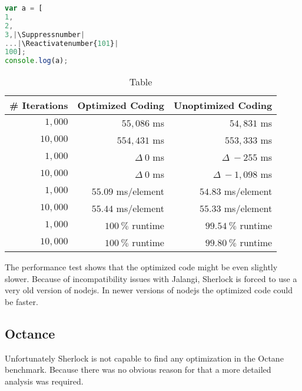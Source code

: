 \begin{lstlisting}[caption=Optimized test coding,label=list:opt_js_test,language=JavaScript]
var a = [
1,
2,
3,|\Suppressnumber|
...|\Reactivatenumber{101}|
100];
console.log(a);
\end{lstlisting}

\begin{table}
\begin{center}
\newcommand*{\thead}[1]{\multicolumn{1}{c}{\bfseries #1}}
\renewcommand{\arraystretch}{1.3}
\begin{tabular}[htbp]{r|r|r}
\thead{\# Iterations} & \thead{Optimized Coding} & \thead{Unoptimized Coding} \\
\hline $1,000$ & $55,086$ ms & $54,831$ ms \\
\hline $10,000$ & $554,431$ ms & $553,333$ ms \\
\hline\hline $1,000$ & $\Delta\ 0$ ms & $\Delta\ -255$ ms \\
\hline $10,000$ & $\Delta\ 0$ ms & $\Delta\ -1,098$ ms \\

\hline\hline $1,000$ & $55.09$ ms/element & $54.83$ ms/element \\
\hline $10,000$ & $55.44$ ms/element & $55.33$ ms/element  \\
\hline\hline $1,000$ & $100\ \%$ runtime & $99.54\ \%$ runtime \\
\hline $10,000$ & $100\ \%$ runtime & $99.80\ \%$ runtime \\ \hline
\end{tabular}
\end{center}
\caption{Table}\label{tab:perf_results}
\end{table}

The performance test shows that the optimized code might be even slightly slower. Because of incompatibility issues with Jalangi, Sherlock is forced to use a very old version of nodejs. In newer versions of nodejs the optimized code could be faster.



\subsection{Octance}

Unfortunately Sherlock is not capable to find any optimization in the Octane benchmark. Because there was no obvious reason for that a more detailed analysis was required.

